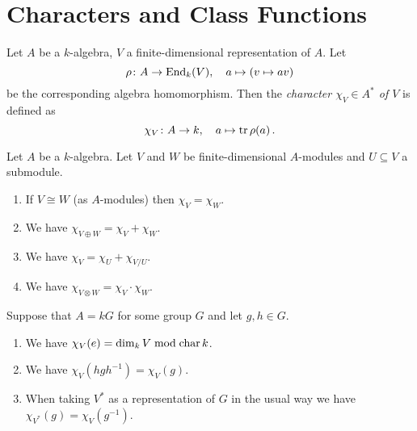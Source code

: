 \section{Characters and Class Functions}


\begin{definition}
  Let $A$ be a $k$-algebra, $V$ a finite-dimensional representation of $A$.
  Let
  \[
            \rho
    \colon  A
    \to     \operatorname{End}_k(V),
    \quad   a
    \mapsto (v \mapsto av)
  \]
  be the corresponding algebra homomorphism.
  Then the \emph{character $\chi_V \in A^*$ of $V$} is defined as
  \[
            \chi_V
    \colon  A
    \to     k,
    \quad   a
    \mapsto \operatorname{tr} \rho(a) \,.
  \]
\end{definition}


\begin{proposition}\label{proposition: properties characters}
  Let $A$ be a $k$-algebra.
  Let $V$ and $W$ be finite-dimensional $A$-modules and $U \subseteq V$ a submodule.
  \begin{enumerate}[label=\emph{\alph*)},leftmargin=*]
    \item
      If $V \cong W$ (as $A$-modules) then $\chi_V = \chi_W$.
    \item
      We have $\chi_{V \oplus W} = \chi_V + \chi_W$.
    \item
      We have $\chi_V = \chi_U + \chi_{V/U}$.
    \item
      We have $\chi_{V \otimes W} = \chi_V \cdot \chi_W$.
  \end{enumerate}
  Suppose that $A = kG$ for some group $G$ and let $g,h \in G$.
  \begin{enumerate}[label=\emph{\alph*)},leftmargin=*,resume]
    \item
      We have $\chi_V(e) = \dim_k V \bmod \operatorname{char} k$.
    \item
      We have $\chi_V(hgh^{-1}) = \chi_V(g)$.
    \item
      When taking $V^*$ as a representation of $G$ in the usual way we have $\chi_{V^*}(g) = \chi_V(g^{-1})$.
  \end{enumerate}
\end{proposition}
